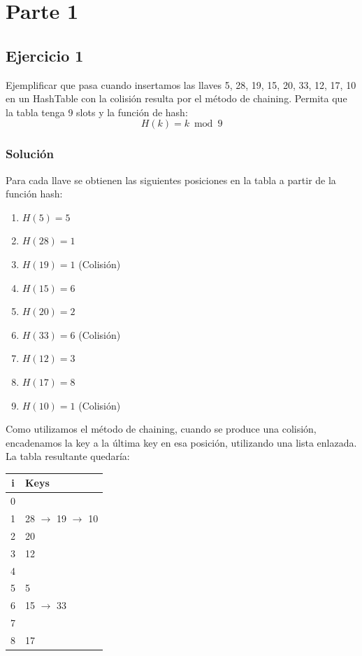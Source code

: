 \documentclass{article}
\begin{document}


\section*{Parte 1}
\subsection*{Ejercicio 1}
Ejemplificar que pasa cuando insertamos las llaves 5, 28, 19, 15, 20, 33, 12, 17, 10 en un HashTable con la colisión resulta por el método de chaining. Permita que la tabla tenga 9 slots y la función de hash:
\begin{equation}
    H(k) = k \bmod 9
\end{equation}
\subsubsection*{Solución}
Para cada llave se obtienen las siguientes posiciones en la tabla a partir de la función hash:
\begin{multicols}{2}
\begin{enumerate}[topsep=0pt, parsep=0pt, itemsep=4pt]
    \item $H(5)  = 5$
    \item $H(28) = 1$
    \item $H(19) = 1$ (Colisión)
    \item $H(15) = 6$
    \item $H(20) = 2$
    \item $H(33) = 6$ (Colisión)
    \item $H(12) = 3$
    \item $H(17) = 8$
    \item $H(10) = 1$ (Colisión)
\end{enumerate}
\end{multicols}
Como utilizamos el método de chaining, cuando se produce una colisión, encadenamos la key a la última key en esa posición, utilizando una lista enlazada. La tabla resultante quedaría:

\begin{center}
\begin{tabular}{|c|l|}
    \hline
    i & Keys \\ \hline
    0 &      \\ \hline
    1 & 28 $\rightarrow$ 19 $\rightarrow$ 10 \\ \hline
    2 & 20   \\ \hline
    3 & 12   \\ \hline
    4 &      \\ \hline
    5 & 5    \\ \hline
    6 & 15 $\rightarrow$ 33 \\ \hline
    7 &      \\ \hline
    8 & 17   \\ \hline
\end{tabular}
\end{center}
\end{document}
